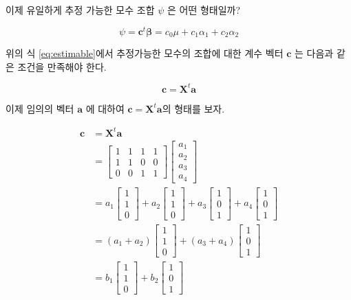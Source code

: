 \documentclass[
]{book}
\theoremstyle{definition}
\theoremstyle{definition}
\theoremstyle{definition}
\theoremstyle{definition}
\theoremstyle{remark}
\begin{document}
이제 유일하게 추정 가능한 모수 조합 \(\psi\) 은 어떤 형태일까?

\[ \psi = \bm c^t \bm \beta = c_0 \mu + c_1 \alpha_1 + c_2 \alpha_2 \]

위의 식 \eqref{eq:estimable}에서 추정가능한 모수의 조합에 대한 계수 벡터 \(\bm c\)
는 다음과 같은 조건을 만족해야 한다.

\[ \bm c = {\bm X}^t \bm a \]

이제 임의의 벡터 \(\bm a\) 에 대하여 \(\bm c= \bm X^t \bm a\)의 형태를 보자.

\begin{align}
\bm c &= 
\bm X^t \bm a \\ & = 
\begin{bmatrix}
1 & 1 & 1 & 1  \\
1 & 1 & 0 & 0  \\
0 & 0 & 1 & 1  
\end{bmatrix}
\begin{bmatrix}
a_1 \\
a_2 \\
a_3 \\
a_4 
\end{bmatrix} \\
& = 
a_1 
\begin{bmatrix}
1 \\
1 \\
0 
\end{bmatrix}
+
a_2
\begin{bmatrix}
1 \\
1 \\
0 
\end{bmatrix}
+ 
a_3 
\begin{bmatrix}
1 \\
0 \\
1 
\end{bmatrix}
+
 a_4
\begin{bmatrix}
1 \\
0 \\
1 
\end{bmatrix} \\
& = 
(a_1 + a_2)
\begin{bmatrix}
1 \\
1 \\
0 
\end{bmatrix}
+ 
(a_3 + a_4)
\begin{bmatrix}
1 \\
0 \\
1 
\end{bmatrix} \\
&= 
b_1
\begin{bmatrix}
1 \\
1 \\
0 
\end{bmatrix}
+ 
b_2
\begin{bmatrix}
1 \\
0 \\
1 
\end{bmatrix} 
\label{eq:esticond}
\end{align}
\end{document}
